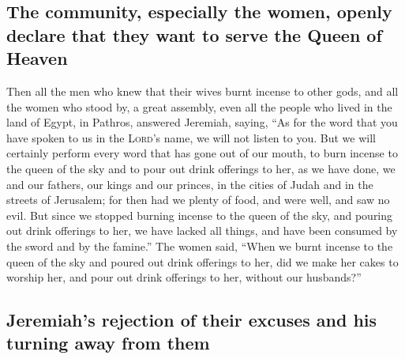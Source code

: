 \hypertarget{the-community-especially-the-women-openly-declare-that-they-want-to-serve-the-queen-of-heaven}{%
\subsection{The community, especially the women, openly declare that
they want to serve the Queen of
Heaven}\label{the-community-especially-the-women-openly-declare-that-they-want-to-serve-the-queen-of-heaven}}

 Then all the men who knew that their wives burnt incense
to other gods, and all the women who stood by, a great assembly, even
all the people who lived in the land of Egypt, in Pathros, answered
Jeremiah, saying,  ``As for the word that you have spoken
to us in the \textsc{Lord}'s name, we will not listen to you.
 But we will certainly perform every word that has gone
out of our mouth, to burn incense to the queen of the sky and to pour
out drink offerings to her, as we have done, we and our fathers, our
kings and our princes, in the cities of Judah and in the streets of
Jerusalem; for then had we plenty of food, and were well, and saw no
evil.  But since we stopped burning incense to the queen
of the sky, and pouring out drink offerings to her, we have lacked all
things, and have been consumed by the sword and by the famine.''
 The women said, ``When we burnt incense to the queen of
the sky and poured out drink offerings to her, did we make her cakes to
worship her, and pour out drink offerings to her, without our
husbands?''

\hypertarget{jeremiahs-rejection-of-their-excuses-and-his-turning-away-from-them}{%
\subsection{Jeremiah's rejection of their excuses and his turning away
from
them}\label{jeremiahs-rejection-of-their-excuses-and-his-turning-away-from-them}}


